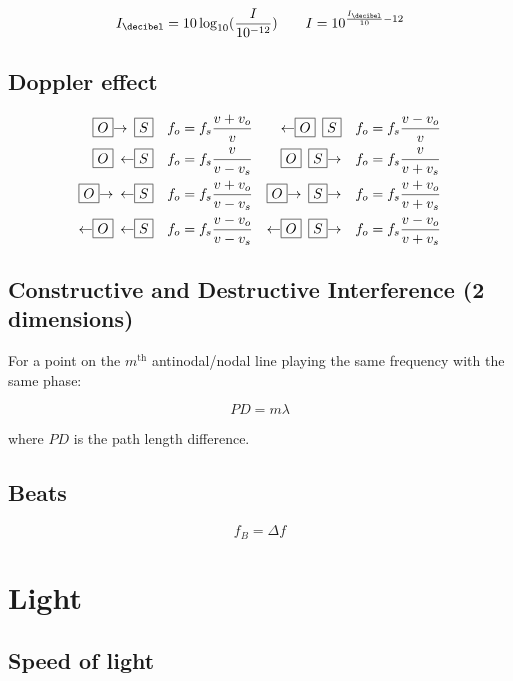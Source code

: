 \[
	I_\decibel = 10 \log_{10} (\frac{I}{10^{-12}}) \qquad
	I = 10^{\frac{I_\decibel}{10} - 12}
\]

\subsection{Doppler effect}

\[\begin{aligned}
	\boxed{O}\smash{\rightarrow} \enspace \boxed{S} \quad f_o &= f_s \frac{v + v_o}{v} &
	\smash{\leftarrow}\boxed{O} \enspace \boxed{S} \quad f_o &= f_s \frac{v - v_o}{v}
	\\
	\boxed{O} \enspace \smash{\leftarrow}\boxed{S}  \quad f_o &= f_s \frac{v}{v - v_s} &
	\boxed{O} \enspace \boxed{S}\smash{\rightarrow} \quad f_o &= f_s \frac{v}{v + v_s}
	\\
	\boxed{O}\smash{\rightarrow} \enspace \smash{\leftarrow}\boxed{S} \quad f_o &= f_s \frac{v + v_o}{v - v_s} &
	\boxed{O}\smash{\rightarrow} \enspace \boxed{S}\smash{\rightarrow} \quad f_o &= f_s \frac{v + v_o}{v + v_s}
	\\
	\smash{\leftarrow}\boxed{O} \enspace \smash{\leftarrow}\boxed{S} \quad f_o &= f_s \frac{v - v_o}{v - v_s} &
	\smash{\leftarrow}\boxed{O} \enspace \boxed{S}\smash{\rightarrow} \quad f_o &= f_s \frac{v - v_o}{v + v_s}
\end{aligned}\]

\subsection{Constructive and Destructive Interference (2 dimensions)}

For a point on the $m^\text{th}$ antinodal/nodal line playing the same frequency with the same phase:

\[
	PD = m \lambda
\]

where $PD$ is the path length difference.

\subsection{Beats}

\[
	f_B = \Delta f
\]
\pagebreak
\section{Light}

\subsection{Speed of light}

